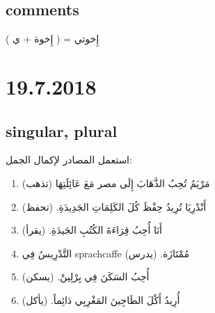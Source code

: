 \documentclass[a4paper]{article}
\begin{document}
\subsection{comments}

(  إِخوة + ي ) = إِخوتي





\section{\textenglish{19.7.2018}}
\subsection{\textenglish{singular, plural}}
استعمل المصادر لإكمال الجمل:


\begin{enumerate}
\item  مَرْيَمُ تُحِبُ الذَّهَابَ إِلَى مصر مَعَ عَائِلَتِهَا (تذهب)
\item  أَنْدْرِيَا تُرِيدُ حِفْظَ كُلَ الكَلِمَاتِ الجَدِيدَةِ. (تحفظ)
  \item  أَنَا أُحِبُ قِرَاءَةَ الكُتُبِ الجَيدَةِ. (يقرأ) 
\item  التَّدْرِيسُ فِي sprachcaffe مُمْتَازَة. (يدرس)
\item أُحِبُ السَكَنَ فِي بِرْلِينْ. (يسكن)
  \item  أُرِيدُ أَكْلَ الطَاجِينَ المَغْرِبِي دَائِماً. (يأكل)
\end{enumerate}
\end{document}
